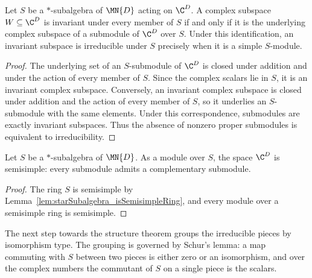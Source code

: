 \begin{lemma}%
    \label{lem:starSubalgebra_irreducible_iff_simple}
    \leanok
    Let $S$ be a $*$-subalgebra of $\MN{D}$ acting on $\C^D$. A complex
    subspace $W\subseteq\C^D$ is invariant under every member of $S$ if and
    only if it is the underlying complex subspace of a submodule of $\C^D$
    over $S$. Under this identification, an invariant subspace is
    irreducible under $S$ precisely when it is a simple $S$-module.
\end{lemma}

\begin{proof}
    \leanok
    The underlying set of an $S$-submodule of $\C^D$ is closed under
    addition and under the action of every member of $S$. Since the complex
    scalars lie in $S$, it is an invariant complex subspace. Conversely, an
    invariant complex subspace is closed under addition and the action of
    every member of $S$, so it underlies an $S$-submodule with the same
    elements. Under this correspondence, submodules are exactly invariant
    subspaces. Thus the absence of nonzero proper submodules is equivalent
    to irreducibility.
\end{proof}

\begin{lemma}%
    \label{lem:starSubalgebra_isSemisimpleModule}
    \leanok
    Let $S$ be a $*$-subalgebra of $\MN{D}$. As a module over $S$, the
    space $\C^D$ is semisimple: every submodule admits a complementary
    submodule.
\end{lemma}

\begin{proof}
    \leanok
    The ring $S$ is semisimple by
    Lemma~\ref{lem:starSubalgebra_isSemisimpleRing}, and every module over a
    semisimple ring is semisimple.
\end{proof}

The next step towards the structure theorem groups the irreducible pieces by
isomorphism type. The grouping is governed by Schur's lemma: a map commuting
with $S$ between two pieces is either zero or an isomorphism, and over the
complex numbers the commutant of $S$ on a single piece is the scalars.

